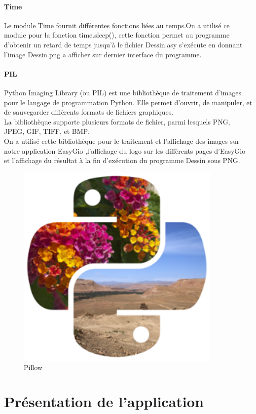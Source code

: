\documentclass[a4paper]{report}
\begin{document}
\subsubsection{Time}
Le module Time fournit différentes fonctions liées au temps.On a utilisé ce module pour la fonction time.sleep(), cette fonction permet au programme d'obtenir un retard de temps jusqu'à le fichier Dessin.asy s'exécute en donnant l'image Dessin.png a afficher sur dernier interface du programme. 
\newpage
\subsubsection{PIL}
Python Imaging Library (ou PIL) est une bibliothèque de traitement d'images pour le langage de programmation Python. Elle permet d'ouvrir, de manipuler, et de sauvegarder différents formats de fichiers graphiques.\\
La bibliothèque supporte plusieurs formats de fichier, parmi lesquels PNG, JPEG, GIF, TIFF, et BMP.\\
On a utilisé cette bibliothèque pour le traitement et l'affichage des images sur notre application EasyGio ,l'affichage du logo sur les différents pages d'EasyGio et l'affichage du résultat à la fin d'exécution du programme Dessin sous PNG.
\begin{figure}[!h]
    \centering
    \includegraphics[width=10cm]{images/pillow-logo-248x250.png}
    \caption{Pillow}
    \label{fig:Pillow}
\end{figure}
\chapter{Présentation de l'application}
\end{document}
